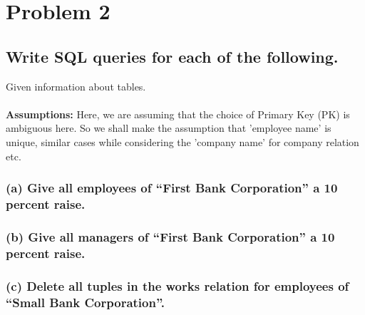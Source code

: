 \documentclass[12pt]{article}
\begin{document}
\newpage

\section{Problem 2}

\subsection*{Write SQL queries for each of the following.}
Given information about tables.
\vspace{3mm} \\
\vspace{5mm} \\
\textbf{Assumptions:}
Here, we are assuming that the choice of Primary Key (PK) is ambiguous here. So we shall make the assumption that 'employee name' is unique, similar cases while considering the 'company name' for company relation etc.

\subsubsection*{(a) Give all employees of “First Bank Corporation” a 10 percent raise.}


\subsubsection*{(b) Give all managers of “First Bank Corporation” a 10 percent raise.}


\subsubsection*{(c) Delete all tuples in the works relation for employees of “Small Bank Corporation”.}
\end{document}
